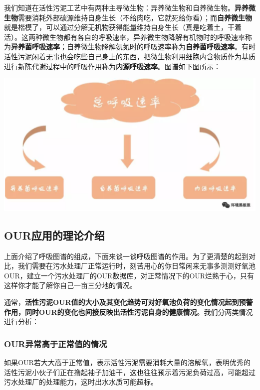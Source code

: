 \documentclass[]{book}
\begin{document}
我们知道在活性污泥工艺中有两种主导微生物：异养微生物和自养微生物。\textbf{异养微生物}需要消耗外部碳源维持自身生长（不给肉吃，它就死给你看）；而\textbf{自养微生物}就是楷模了，可以通过分解无机物获得能量维持自身生长（真是吃着土，干着活）。这两种微生物都有各自的呼吸速率，异养微生物降解有机物时的呼吸速率称为\textbf{异养菌呼吸速率}；自养微生物降解氨氮时的呼吸速率称为\textbf{自养菌呼吸速率}。有时活性污泥闲着无事也会吃些自己身上的东西，把微生物利用细胞内含物质作为基质进行新陈代谢过程中的呼吸作用称为\textbf{内源呼吸速率}。图谱如下图所示：

\includegraphics[width=6.67in]{images/os2}

\hypertarget{ourux5e94ux7528ux7684ux7406ux8bbaux4ecbux7ecd}{%
\subsection{OUR应用的理论介绍}\label{ourux5e94ux7528ux7684ux7406ux8bbaux4ecbux7ecd}}

上面介绍了呼吸图谱的组成，下面来谈一谈呼吸图谱的作用。为了更清楚的起到对比，我们需要在污水处理厂正常运行时，刻苦用心的你日常闲来无事多测测好氧池OUR，建立一个污水处理厂的OUR数据库，对正常情况下的OUR烂熟于心，只有这样你才能了解你自己一亩三分地的情况。

通常，\textbf{活性污泥OUR值的大小及其变化趋势可对好氧池负荷的变化情况起到预警作用，同时OUR的变化也间接反映出活性污泥自身的健康情况}。我们分两类情况进行分析：

\hypertarget{ourux5f02ux5e38ux9ad8ux4e8eux6b63ux5e38ux503cux7684ux60c5ux51b5}{%
\subsubsection{OUR异常高于正常值的情况}\label{ourux5f02ux5e38ux9ad8ux4e8eux6b63ux5e38ux503cux7684ux60c5ux51b5}}

如果OUR若大大高于正常值，表示活性污泥需要消耗大量的溶解氧，表明优秀的活性污泥小伙子们正在撸起袖子加油干，这也往往预示着污泥负荷过高，可能超过污水处理厂的处理能力，这时出水水质可能超标。
\end{document}
